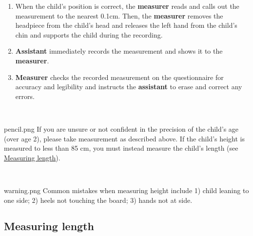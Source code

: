 \documentclass[
  12pt,
]{book}
\newenvironment{rmdnote}
  {\begin{tcolorbox}[width=\textwidth, 
                     colback = {white}, 
                     title = {\textbf{Note}}, 
                     colbacktitle = lightgray,
                     coltitle = black]
  \begin{includegraphics}[scale = 1]{pencil.png}}
  {\end{includegraphics}
  \end{tcolorbox}}
\newenvironment{rmdwarning}
  {\begin{tcolorbox}[width=\textwidth, 
                     colback = {white}, 
                     title = {\textbf{Warning}}, 
                     colbacktitle = lightgray,
                     coltitle = black]
  \begin{includegraphics}[scale = 1]{warning.png}}
  {\end{includegraphics}
  \end{tcolorbox}}
\begin{document}
\begin{enumerate}
\item
  When the child's position is correct, the \textbf{measurer} reads and calls out the measurement to the nearest 0.1cm. Then, the \textbf{measurer} removes the headpiece from the child's head and releases the left hand from the child's chin and supports the child during the recording.
\item
  \textbf{Assistant} immediately records the measurement and shows it to the \textbf{measurer}.
\item
  \textbf{Measurer} checks the recorded measurement on the questionnaire for accuracy and legibility and instructs the \textbf{assistant} to erase and correct any errors.
\end{enumerate}

~

\begin{rmdnote}
If you are unsure or not confident in the precision of the child's age (over age 2), please take measurement as described above. If the child's height is measured to less than 85 cm, you must instead measure the child's length (see \protect\hyperlink{measuring-length}{Measuring length}).
\end{rmdnote}

~

\begin{rmdwarning}
Common mistakes when measuring height include 1) child leaning to one side; 2) heels not touching the board; 3) hands not at side.
\end{rmdwarning}

\hypertarget{measuring-length}{%
\subsection{Measuring length}\label{measuring-length}}
\end{document}
